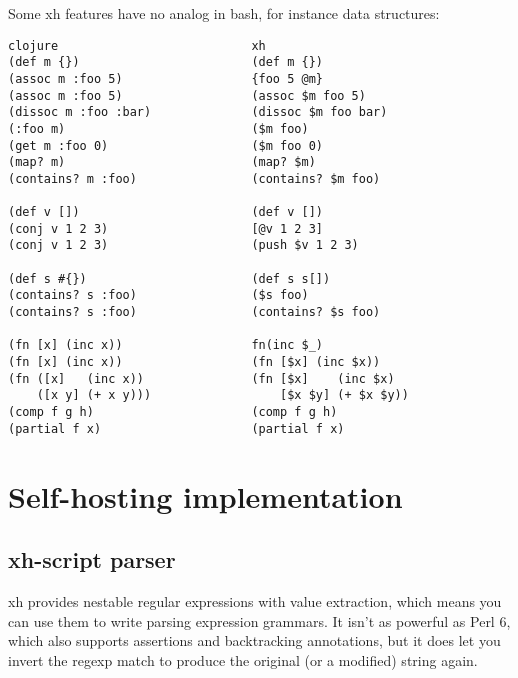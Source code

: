 \documentclass{report}
\begin{document}
    \noindent Some xh features have no analog in bash, for instance data
    structures:

\begin{verbatim}
clojure                           xh
(def m {})                        (def m {})
(assoc m :foo 5)                  {foo 5 @m}
(assoc m :foo 5)                  (assoc $m foo 5)
(dissoc m :foo :bar)              (dissoc $m foo bar)
(:foo m)                          ($m foo)
(get m :foo 0)                    ($m foo 0)
(map? m)                          (map? $m)
(contains? m :foo)                (contains? $m foo)

(def v [])                        (def v [])
(conj v 1 2 3)                    [@v 1 2 3]
(conj v 1 2 3)                    (push $v 1 2 3)

(def s #{})                       (def s s[])
(contains? s :foo)                ($s foo)
(contains? s :foo)                (contains? $s foo)

(fn [x] (inc x))                  fn(inc $_)
(fn [x] (inc x))                  (fn [$x] (inc $x))
(fn ([x]   (inc x))               (fn [$x]    (inc $x)
    ([x y] (+ x y)))                  [$x $y] (+ $x $y))
(comp f g h)                      (comp f g h)
(partial f x)                     (partial f x)
\end{verbatim}

\part{Self-hosting implementation}\label{part:self-hosting-implementation}
\chapter{xh-script parser}\label{chp:xh-script-parser}
  xh provides nestable regular expressions with value extraction, which means
  you can use them to write parsing expression grammars. It isn't as powerful
  as Perl 6, which also supports assertions and backtracking annotations, but
  it does let you invert the regexp match to produce the original (or a
  modified) string again.
\end{document}
